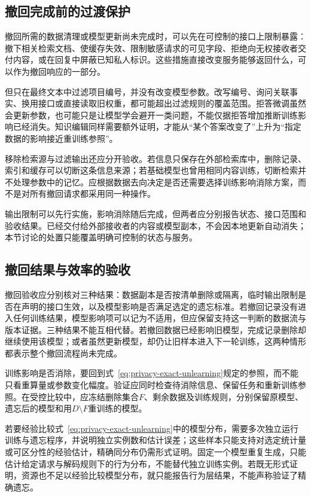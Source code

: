 \subsection{撤回完成前的过渡保护}
\label{sec:privacy-unlearning-output-control}

撤回所需的数据清理或模型更新尚未完成时，可以先在可控制的接口上限制暴露：撤下相关检索文档、使缓存失效、限制敏感请求的可见字段、拒绝向无权接收者交付内容，或在回复中屏蔽已知私人标识。这些措施直接改变服务能够返回什么，可以作为撤回响应的一部分。

但只在最终文本中过滤项目编号，并没有改变模型参数。改写编号、询问关联事实、换用接口或直接读取旧权重，都可能超出过滤规则的覆盖范围。拒答微调虽然会更新参数，也可能只是让模型学会避开一类问题，不能仅据拒答增加推断训练影响已经消失。知识编辑同样需要额外证明，才能从“某个答案改变了”上升为“指定数据的影响接近重训练参照”。

移除检索源与过滤输出还应分开验收。若信息只保存在外部检索库中，删除记录、索引和缓存可以切断这条信息来源；若基础模型也曾用相同内容训练，切断检索并不处理参数中的记忆。应根据数据去向决定是否还需要选择训练影响消除方案，而不是对所有撤回请求都采用同一种操作。

输出限制可以先行实施，影响消除随后完成，但两者应分别报告状态、接口范围和验收结果。已经交付给外部接收者的内容或模型副本，不会因本地更新自动消失；本节讨论的处置只能覆盖明确可控制的状态与服务。

\subsection{撤回结果与效率的验收}
\label{sec:privacy-unlearning-validation}

撤回验收应分别核对三种结果：数据副本是否按清单删除或隔离，临时输出限制是否在声明的接口生效，以及模型影响是否满足选定的遗忘标准。若撤回记录没有进入任何训练结果，模型影响项可以记为不适用，但应保留支持这一判断的数据流与版本证据。三种结果不能互相代替。若撤回数据已经影响旧模型，完成记录删除却继续使用该模型；或者虽然更新模型，却仍让旧样本进入下一轮训练，这两种情形都表示整个撤回流程尚未完成。

训练影响是否消除，要回到式~\eqref{eq:privacy-exact-unlearning}规定的参照，而不能只看重算量或参数变化幅度。验证应同时检查待消除信息、保留任务和重新训练参照。在受控比较中，应冻结删除集合$F$、剩余数据及训练规则，分别保留原模型、遗忘后的模型和用$D\setminus F$重训练的模型。

若要经验比较式~\eqref{eq:privacy-exact-unlearning}中的模型分布，需要多次独立运行训练与遗忘程序，并说明独立实例数和估计误差；这些样本只能支持对选定统计量或可区分性的经验估计，精确同分布仍需形式证明。固定一个模型重复生成，只能估计给定请求与解码规则下的行为分布，不能替代独立训练实例。若既无形式证明，资源也不足以经验比较模型分布，就只能报告行为层结果，不能声称验证了精确遗忘。

